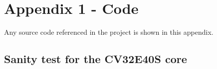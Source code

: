 \chapter{Appendix 1 - Code}
\label{app:appx1}

Any source code referenced in the project is shown in this appendix.

\section{Sanity test for the CV32E40S core}
\label{app:helloworldC}

\lstset{ 
   language=C,                   %
   breaklines=true,                %
   breakatwhitespace=false,        %
}
